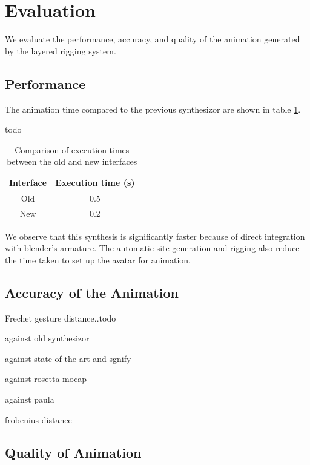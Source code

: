 \documentclass[../../main.tex]{subfiles}
\begin{document}
\section{Evaluation}
\label{ch:rigging_layers:evaluation}

We evaluate the performance, accuracy, and quality of the animation generated by the layered rigging system.

\subsection{Performance}
\label{ch:rigging_layers:evaluation:performance}

The animation time compared to the previous synthesizor are shown in table \ref{tab:faster_executions}.

todo
\begin{table}
    \centering
    \begin{tabular}{|c|c|}
        \hline
        \textbf{Interface} & \textbf{Execution time (s)} \\
        \hline
        Old & 0.5 \\
        New & 0.2 \\
        \hline
    \end{tabular}
    \caption{Comparison of execution times between the old and new interfaces}
    \label{tab:faster_executions}
\end{table}

We observe that this synthesis is significantly faster because of direct integration with blender's armature. The automatic site generation and rigging also reduce the time taken to set up the avatar for animation.

\subsection{Accuracy of the Animation}
\label{ch:rigging_layers:evaluation:accuracy}

Frechet gesture distance..todo

against old synthesizor

against state of the art and sgnify

against rosetta mocap

against paula

frobenius distance

\subsection{Quality of Animation}
\label{ch:rigging_layers:evaluation:quality}
\end{document}

